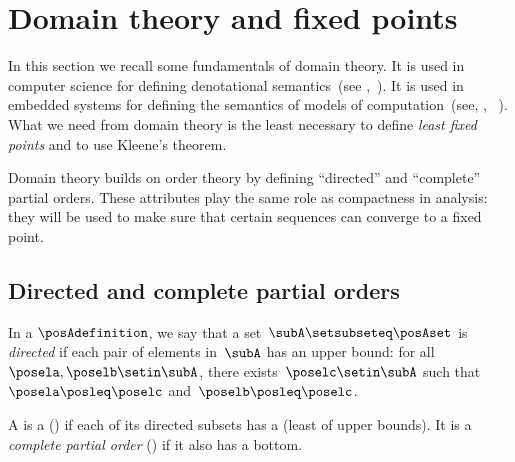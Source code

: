 
\section{Domain theory and fixed points}
\label{sec:Monotonicity-and-fixed}

In this section we recall some fundamentals of domain theory.
It is used in computer science for defining denotational semantics~(see \eg,~\cite{manes86}).
It is used in embedded systems for defining the semantics of models of computation~(see, \eg, ~\cite{lee10}).
What we need from domain theory is the least necessary to define \emph{least fixed points} and to use Kleene's theorem.

Domain theory builds on order theory by defining ``directed'' and ``complete'' partial orders.
These attributes play the same role as compactness in analysis: they will be used to make sure that certain sequences can converge to a fixed point.

\subsection{Directed and complete partial orders}

\begin{ctdefinition}
    \label{def:directed-set}
    In a  $\posAdefinition$, we say that a set~$\subA\setsubseteq\posAset$ is \emph{directed} if each pair of elements in~$\subA$ has an upper bound: for all~$\posela,\poselb \setin \subA$, there exists~$\poselc\setin \subA$ such that~$\posela\posleq \poselc$ and~$\poselb\posleq \poselc$.
\end{ctdefinition}

\begin{ctdefinition}[Completeness]
    \label{def:cpo}
    A  is a  (\DCPO) if each of its directed subsets has a  (least of upper bounds).
    It is a \emph{complete partial order} (\CPO) if it also has a bottom.
\end{ctdefinition}

